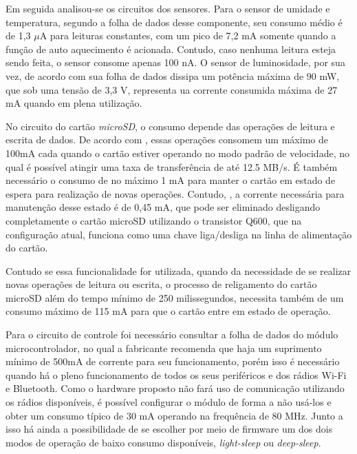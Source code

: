 Em seguida analisou-se os circuitos dos sensores. Para o sensor de umidade e temperatura, segundo a folha de dados desse componente, seu consumo médio é de 1,3 $\mu$A para leituras constantes, com um pico de 7,2 mA somente quando a função de auto aquecimento é acionada. Contudo, caso nenhuma leitura esteja sendo feita, o sensor consome apenas 100 nA. O sensor de luminosidade, por sua vez, de acordo com sua folha de dados dissipa um potência máxima de 90 mW, que sob uma tensão de 3,3 V, representa ua corrente consumida máxima de 27 mA quando em plena utilização. 

No circuito do cartão \textit{microSD}, o consumo depende das operações de leitura e escrita de dados. De acordo com , essas operações consomem um máximo de 100mA cada quando o cartão estiver operando no modo padrão de velocidade, no qual é possível atingir uma taxa de transferência de até 12.5 MB/s. É também necessário o consumo de no máximo 1 mA para manter o cartão em estado de espera para realização de novas operações. Contudo, , a corrente necessária para manutenção desse estado é de 0,45 mA, que pode ser eliminado desligando completamente o cartão microSD utilizando o transistor Q600, que na configuração atual, funciona como uma chave liga/desliga na linha de alimentação do cartão.

Contudo se essa funcionalidade for utilizada, quando da necessidade de se realizar novas operações de leitura ou escrita, o processo de religamento do cartão microSD além do tempo mínimo de 250 milissegundos, necessita também de um consumo máximo de 115 mA para que o cartão entre em estado de operação. 

Para o circuito de controle foi necessário consultar a folha de dados do módulo microcontrolador, no qual a fabricante recomenda que haja um suprimento mínimo de 500mA de corrente para seu funcionamento, porém isso é necessário quando há o pleno funcionamento de todos os seus periféricos e dos rádios Wi-Fi e Bluetooth. Como o hardware proposto não fará uso de comunicação utilizando os rádios disponíveis, é possível configurar o módulo de forma a não usá-los e obter um consumo típico de 30 mA operando na frequência de 80 MHz. Junto a isso há ainda a possibilidade de se escolher por meio de firmware um dos dois modos de operação de baixo consumo disponíveis, \textit{light-sleep} ou \textit{deep-sleep}. 

